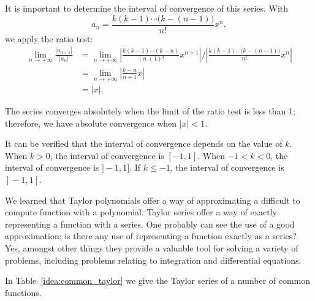 \begin{example}
It is important to determine the interval of convergence of this series. With 
$$a_n = \frac{k(k-1)\cdots\big(k-(n-1)\big)}{n!}x^n,$$
we apply the ratio test:
\begin{align*}
\lim_{n\to+\infty}\frac{|a_{n+1}|}{|a_n|}&=\lim_{n\to+\infty} \left|\frac{k(k-1)\cdots(k-n)}{(n+1)!}x^{n+1}\right|\Bigg/\left|\frac{k(k-1)\cdots\big(k-(n-1)\big)}{n!}x^n\right|\\
		&=\lim_{n\to+\infty} \left|\frac{k-n}{n+1}x\right|\\
		&= |x|.
\end{align*}

The series converges absolutely when the limit of the ratio test is less than 1; therefore, we have absolute convergence when $|x|<1$. 

It can be verified that the interval of convergence depends on the value of $k$. When $k>0$, the interval of convergence is $[-1,1]$. When $-1<k<0$, the interval of convergence is $]-1,1]$. If $k\leq -1$, the interval of convergence is $\left.\right]-1,1\left[\right.$.

\end{example}

We learned that Taylor polynomials offer a way of approximating a difficult to compute function with a polynomial. Taylor series offer a way of exactly representing a function with a series. One probably can see the use of a good approximation; is there any use of representing a function exactly as a series? Yes, amongst other things they provide a valuable tool for solving a variety of problems, including problems relating to integration and differential equations. 

In Table~\ref{idea:common_taylor} we give  the Taylor series of a number of common functions. 

